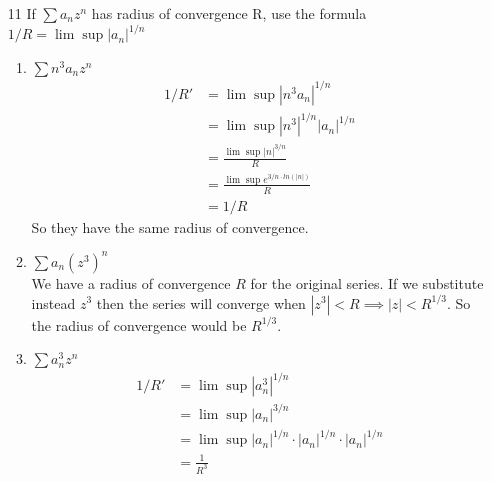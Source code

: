 \documentclass{article}
\begin{document}
\begin{enumerate}
\begin{enumerate}[label=(\roman*)]
      \end{enumerate}
    \item[11] If $\sum a_nz^n$ has radius of convergence R, use the formula $1/R=\lim\sup|a_n|^{1/n}$\\
      \begin{enumerate}[label=(\roman*)]
        \item $\sum n^3a_nz^n$\\
          \begin{align*}
            1/R'&=\lim\sup|n^3a_n|^{1/n}\\
            &=\lim\sup|n^3|^{1/n}|a_n|^{1/n}\\
            &=\frac{\lim\sup|n|^{3/n}}{R}\\
            &=\frac{\lim\sup e^{3/n\cdot ln(|n|)}}{R}\\
            &=1/R
          \end{align*}
          So they have the same radius of convergence.
        \item $\sum a_n(z^3)^{n}$\\
          We have a radius of convergence $R$ for the original series. If we substitute instead $z^3$ then the series will converge when $|z^3|<R\implies|z|<R^{1/3}$. So the radius of convergence would be $R^{1/3}$.
        \item $\sum a_n^3z^n$\\
          \begin{align*}
            1/R'&=\lim\sup|a_n^3|^{1/n}\\
            &=\lim\sup|a_n|^{3/n}\\
            &=\lim\sup|a_n|^{1/n}\cdot|a_n|^{1/n}\cdot|a_n|^{1/n}\\
            &=\frac{1}{R^3}
          \end{align*}
      \end{enumerate}
  \end{enumerate}
\end{document}
